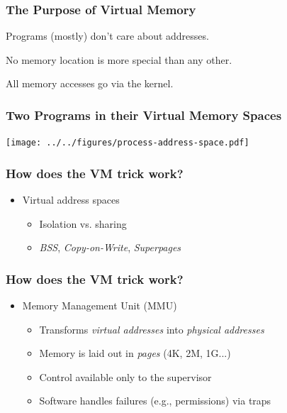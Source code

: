 \documentclass[pdftex]{beamer} %
\begin{document}
\begin{frame}
  \frametitle{The Purpose of Virtual Memory}
  \begin{description}[labelwidth=\widthof{Simplification}]
  \item [Simplification] Programs (mostly) don't care about addresses.
  \item [Portability] No memory location is more special than any other.
  \item [Protection] All memory accesses go via the kernel.
  \end{description}
\end{frame}

\begin{frame}
  \frametitle{Two Programs in their Virtual Memory Spaces}

  \begin{center}
    \texttt{[image: ../../figures/process-address-space.pdf]}
  \end{center}
\end{frame}

\begin{frame}
  \frametitle{How does the VM trick work?}

  \begin{itemize}
  \item Virtual address spaces
    \begin{itemize}
    \item Isolation vs. sharing
    \item \textit{BSS}, \textit{Copy-on-Write}, \textit{Superpages}
    \end{itemize}
  \end{itemize}
\end{frame}

\begin{frame}
  \frametitle{How does the VM trick work?}

  \begin{itemize}

    \item Memory Management Unit (MMU)
    \begin{itemize}
      \item Transforms \textit{virtual addresses} into \textit{physical addresses}
      \item Memory is laid out in \textit{pages} (4K, 2M, 1G...)
      \item Control available only to the supervisor
      \item Software handles failures (e.g., permissions) via traps
    \end{itemize}
  \end{itemize}
\end{frame}
\end{document}
